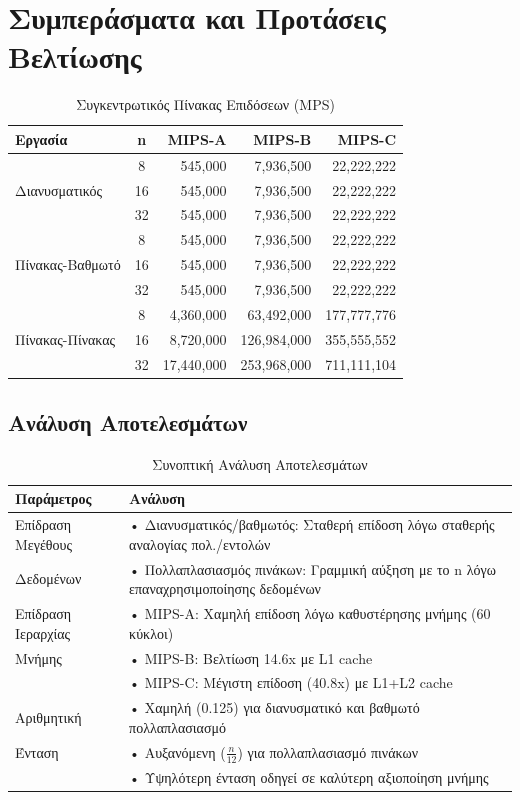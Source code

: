 \documentclass[11pt,a4paper]{article}
\begin{document}
    \section{Συμπεράσματα και Προτάσεις Βελτίωσης}

\begin{table}[H]
    \centering
    \small
    \begin{tabular}{|l|c|r|r|r|}
        \hline
        \textbf{Εργασία} & \textbf{n} & \textbf{MIPS-A} & \textbf{MIPS-B} & \textbf{MIPS-C} \\
        \hline
        \multirow{3}{*}{Διανυσματικός} & 8 & 545,000 & 7,936,500 & 22,222,222 \\
        & 16 & 545,000 & 7,936,500 & 22,222,222 \\
        & 32 & 545,000 & 7,936,500 & 22,222,222 \\
        \hline
        \multirow{3}{*}{Πίνακας-Βαθμωτό} & 8 & 545,000 & 7,936,500 & 22,222,222 \\
        & 16 & 545,000 & 7,936,500 & 22,222,222 \\
        & 32 & 545,000 & 7,936,500 & 22,222,222 \\
        \hline
        \multirow{3}{*}{Πίνακας-Πίνακας} & 8 & 4,360,000 & 63,492,000 & 177,777,776 \\
        & 16 & 8,720,000 & 126,984,000 & 355,555,552 \\
        & 32 & 17,440,000 & 253,968,000 & 711,111,104 \\
        \hline
    \end{tabular}
    \caption{Συγκεντρωτικός Πίνακας Επιδόσεων (MPS)}
    \label{tab:performance_summary}
\end{table}

\subsection{Ανάλυση Αποτελεσμάτων}
\begin{table}[H]
\centering
\begin{tabular}{|l|p{11cm}|}
\hline
\textbf{Παράμετρος} & \textbf{Ανάλυση} \\
\hline
Επίδραση Μεγέθους & • Διανυσματικός/βαθμωτός: Σταθερή επίδοση λόγω σταθερής αναλογίας πολ./εντολών \\
Δεδομένων & • Πολλαπλασιασμός πινάκων: Γραμμική αύξηση με το n λόγω επαναχρησιμοποίησης δεδομένων \\
\hline
Επίδραση Ιεραρχίας & • MIPS-A: Χαμηλή επίδοση λόγω καθυστέρησης μνήμης (60 κύκλοι) \\
Μνήμης & • MIPS-B: Βελτίωση 14.6x με L1 cache \\
& • MIPS-C: Μέγιστη επίδοση (40.8x) με L1+L2 cache \\
\hline
Αριθμητική & • Χαμηλή (0.125) για διανυσματικό και βαθμωτό πολλαπλασιασμό \\
Ένταση & • Αυξανόμενη ($\frac{n}{12}$) για πολλαπλασιασμό πινάκων \\
& • Υψηλότερη ένταση οδηγεί σε καλύτερη αξιοποίηση μνήμης \\
\hline
\end{tabular}
\caption{Συνοπτική Ανάλυση Αποτελεσμάτων}
\label{tab:results-analysis}
\end{table}
\end{document}
